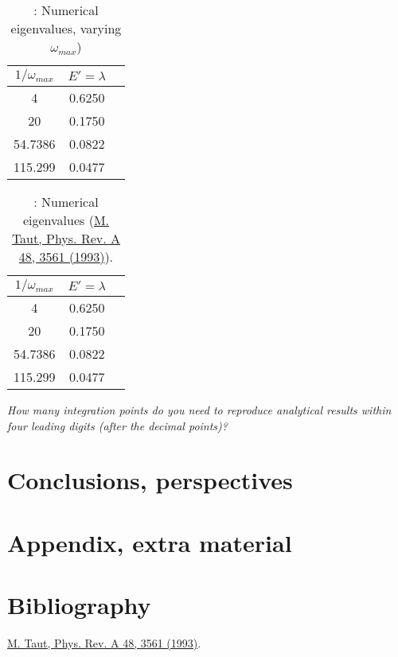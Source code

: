\documentclass{article}
\begin{document}
		\begin{table}[h!]
			\caption{: Numerical eigenvalues, varying $\omega_{max}$)}
			\begin{tabular}{c c c}
				$1/\omega_{max}$ & $E' = \lambda$ \\
				\hline
				4 & 0.6250 \\
				20 & 0.1750 \\
				54.7386 & 0.0822 \\
				115.299 & 0.0477 \\
			\end{tabular}
		\end{table}
		\begin{table}[h!]
			\caption{: Numerical eigenvalues (\href{http://prola.aps.org/abstract/PRA/v48/i5/p3561_1}{M. Taut, Phys. Rev. A 48, 3561 (1993)}).}
			\begin{tabular}{c c c}
				$1/\omega_{max}$ & $E' = \lambda$ \\
				\hline
				4 & 0.6250 \\
				20 & 0.1750 \\
				54.7386 & 0.0822 \\
				115.299 & 0.0477 \\
			\end{tabular}
		\end{table}
		
		\textit{How many integration points do you need to reproduce analytical results
		within four leading digits (after the decimal points)?}


\section{Conclusions, perspectives}

\section{Appendix, extra material}

\section{Bibliography}
	\href{http://prola.aps.org/abstract/PRA/v48/i5/p3561_1}{M. Taut, Phys. Rev. A 48, 3561 (1993)}.
\end{document}
